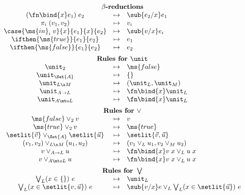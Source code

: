 \documentclass{article}
\newcommand{\tforin}[2]{\bigvee_{#1}(#2)\ }
\newcommand{\step}{\mapsto}
\begin{document}
\[
\begin{array}{ccl}
  \multicolumn{3}{c}{\textbf{$\beta$-reductions}}\\
  (\fn\bind{x}e_1) \; e_2 &\step& \sub{e_2/x} e_1\\
  \pi_i \; (v_1, v_2) &\step& v_i\\
  \case{\ms{in}_i\; v}{x}{e_1}{x}{e_2} &\step& \sub{v/x} e_i\\
  \ifthen{\ms{true}}{e_1}{e_2} &\step& e_1\\
  \ifthen{\ms{false}}{e_1}{e_2} &\step& e_2

  \vspace{0.5em}\\
  \multicolumn{3}{c}{\textbf{Rules for }\unit}\\
  \unit_2 &\step& \ms{false}\\
  \unit_{\Set{A}} &\step& \{\}\\
  \unit_{L \x M} &\step& (\unit_L, \unit_M)\\
  \unit_{A \to L} &\step& \fn\bind{x} \unit_L\\
  \unit_{A \mto L} &\step& \fn\bind{x} \unit_L

  \vspace{0.5em}\\
  \multicolumn{3}{c}{\textbf{Rules for }\vee}\\
  \ms{false} \vee_2 v &\step& v\\
  \ms{true} \vee_2 v &\step& \ms{true}\\
  \setlit{\vec{v}} \vee_{\Set{A}} \setlit{\vec{u}} &\step& \setlit{\vec{v}, \vec{u}}\\
  (v_1, v_2) \vee_{L \x M} (u_1, u_2) &\step& (v_1 \vee_L u_1, v_2 \vee_M u_2)\\
  v \vee_{A \to L} u &\step& \fn\bind{x} v\;x \vee_L u\;x\\
  v \vee_{A \mto L} u &\step& \fn\bind{x} v\;x \vee_L u\;x

  \vspace{0.5em}\\
  \multicolumn{3}{c}{\textbf{Rules for }\bigvee}\\
  \tforin{L}{x \in \{\}} e &\step& \unit_L\\
  \tforin{L}{x \in \setlit{v, \vec{u}}} e
  &\step& \sub{v/x} e \vee_L \tforin{L}{x \in \setlit{\vec{u}}} e


\end{array}\]
\end{document}
